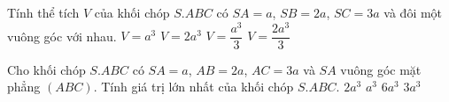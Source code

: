 \begin{vd}%
	Tính thể tích $V$ của khối chóp $S.ABC$ có $SA=a$, $SB=2a$, $SC=3a$ và đôi một vuông góc với nhau.
	\choice
	{\True $V=a^3 $}
	{$V=2a^3 $}
	{$V=\dfrac{a^3}{3} $}
	{$V=\dfrac{2a^3}{3} $}
\end{vd}

\begin{vd}%
	Cho khối chóp $S.ABC$ có $SA=a$, $AB=2a$, $AC=3a$ và $SA$ vuông góc mặt phẳng $(ABC)$. Tính giá trị lớn nhất của khối chóp $S.ABC$.
	\choice
	{$2a^3 $}
	{\True $a^3 $}
	{$6a^3 $}
	{$3a^3 $}
\end{vd}

